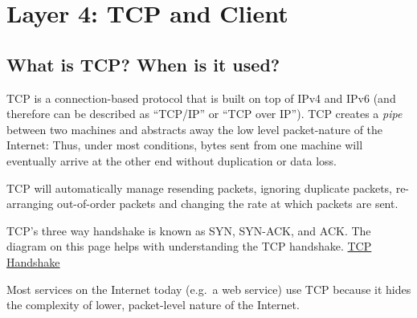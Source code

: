 \section{Layer 4: TCP and Client}

\subsection{What is TCP? When is it used?}\label{what-is-tcp-when-is-it-used}

TCP is a connection-based protocol that is built on top of IPv4 and IPv6 (and therefore can be described as ``TCP/IP'' or ``TCP over IP''). TCP creates a \emph{pipe} between two machines and abstracts away the low level packet-nature of the Internet: Thus, under most conditions, bytes sent from one machine will eventually arrive at the other end without duplication or data loss.

TCP will automatically manage resending packets, ignoring duplicate packets, re-arranging out-of-order packets and changing the rate at which packets are sent.

TCP's three way handshake is known as SYN, SYN-ACK, and ACK. The diagram on this page helps with understanding the TCP handshake. \href{http://www.inetdaemon.com/tutorials/internet/tcp/3-way_handshake.shtml}{TCP Handshake}

Most services on the Internet today (e.g.~a web service) use TCP because it hides the complexity of lower, packet-level nature of the Internet.

